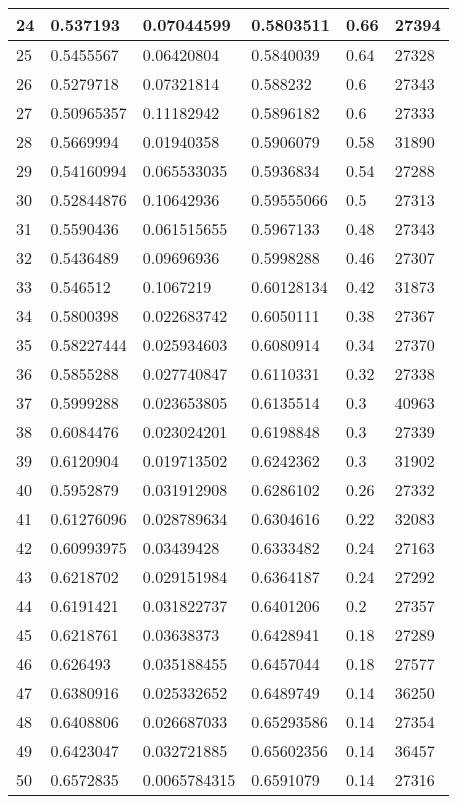 \begin{longtable}{|l|l|l|l|l|l|}
24 & 0.537193 & 0.07044599 & 0.5803511 & 0.66 & 27394 \\ \hline 
25 & 0.5455567 & 0.06420804 & 0.5840039 & 0.64 & 27328 \\ \hline 
26 & 0.5279718 & 0.07321814 & 0.588232 & 0.6 & 27343 \\ \hline 
27 & 0.50965357 & 0.11182942 & 0.5896182 & 0.6 & 27333 \\ \hline 
28 & 0.5669994 & 0.01940358 & 0.5906079 & 0.58 & 31890 \\ \hline 
29 & 0.54160994 & 0.065533035 & 0.5936834 & 0.54 & 27288 \\ \hline 
30 & 0.52844876 & 0.10642936 & 0.59555066 & 0.5 & 27313 \\ \hline 
31 & 0.5590436 & 0.061515655 & 0.5967133 & 0.48 & 27343 \\ \hline 
32 & 0.5436489 & 0.09696936 & 0.5998288 & 0.46 & 27307 \\ \hline 
33 & 0.546512 & 0.1067219 & 0.60128134 & 0.42 & 31873 \\ \hline 
34 & 0.5800398 & 0.022683742 & 0.6050111 & 0.38 & 27367 \\ \hline 
35 & 0.58227444 & 0.025934603 & 0.6080914 & 0.34 & 27370 \\ \hline 
36 & 0.5855288 & 0.027740847 & 0.6110331 & 0.32 & 27338 \\ \hline 
37 & 0.5999288 & 0.023653805 & 0.6135514 & 0.3 & 40963 \\ \hline 
38 & 0.6084476 & 0.023024201 & 0.6198848 & 0.3 & 27339 \\ \hline 
39 & 0.6120904 & 0.019713502 & 0.6242362 & 0.3 & 31902 \\ \hline 
40 & 0.5952879 & 0.031912908 & 0.6286102 & 0.26 & 27332 \\ \hline 
41 & 0.61276096 & 0.028789634 & 0.6304616 & 0.22 & 32083 \\ \hline 
42 & 0.60993975 & 0.03439428 & 0.6333482 & 0.24 & 27163 \\ \hline 
43 & 0.6218702 & 0.029151984 & 0.6364187 & 0.24 & 27292 \\ \hline 
44 & 0.6191421 & 0.031822737 & 0.6401206 & 0.2 & 27357 \\ \hline 
45 & 0.6218761 & 0.03638373 & 0.6428941 & 0.18 & 27289 \\ \hline 
46 & 0.626493 & 0.035188455 & 0.6457044 & 0.18 & 27577 \\ \hline 
47 & 0.6380916 & 0.025332652 & 0.6489749 & 0.14 & 36250 \\ \hline 
48 & 0.6408806 & 0.026687033 & 0.65293586 & 0.14 & 27354 \\ \hline 
49 & 0.6423047 & 0.032721885 & 0.65602356 & 0.14 & 36457 \\ \hline 
50 & 0.6572835 & 0.0065784315 & 0.6591079 & 0.14 & 27316 \\ \hline 
\end{longtable}